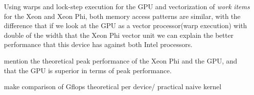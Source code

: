 \par{Using warps and lock-step execution for the 
    GPU and vectorization of \emph{work items} for the Xeon and Xeon Phi, both
    memory access patterns are similar, with the difference that if we look at
    the GPU as a vector processor(warp execution) with double of the width that the
    Xeon Phi vector unit we can explain the better performance that this device 
    has against both Intel processors.}

\par{{\color{red} mention the theoretical peak performance of the Xeon Phi and 
    the GPU, and that the GPU is superior in terms of peak performance.}}

\par{{\color{red} make comparison of Gflops theoretical per device/ practical
    naive kernel}}




